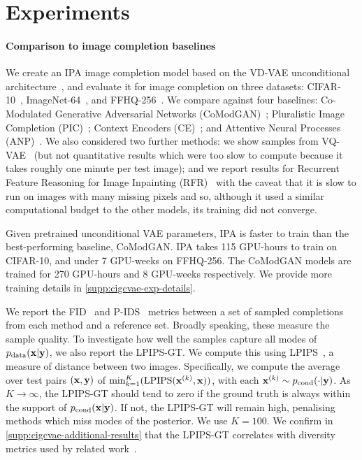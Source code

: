 \section{Experiments} \label{sec:cigcvae-experiments}

\paragraph{Comparison to image completion baselines}

We create an IPA image completion model based on the VD-VAE unconditional
architecture~\citep{child2020very}, and evaluate it for image completion on
three datasets: CIFAR-10~\citep{krizhevsky2009learning},
ImageNet-64~\citep{deng2009imagenet}, and FFHQ-256~\citep{karras2019style}. We
compare against four baselines: Co-Modulated Generative Adversarial Networks
(CoModGAN)~\citep{zhao2021large}; Pluralistic Image Completion
(PIC)~\citep{zheng2019pluralistic}; Context Encoders
(CE)~\citep{pathak2016context}; and Attentive Neural Processes
(ANP)~\citep{kim2019attentive}. We also considered two further methods: we show
samples from VQ-VAE~\citep{peng2021generating} (but not quantitative results
which were too slow to compute because it takes roughly one minute per test
image); and we report results for Recurrent Feature Reasoning for Image
Inpainting (RFR)~\citep{li2020recurrent} with the caveat that it is slow to run
on images with many missing pixels and so, although it used a similar
computational budget to the other models, its training did not converge.

Given pretrained unconditional VAE parameters, IPA is faster to train than the
best-performing baseline, CoModGAN. IPA takes 115 GPU-hours to train on
CIFAR-10, and under 7 GPU-weeks on FFHQ-256. The CoModGAN models are trained for
270 GPU-hours and 8 GPU-weeks respectively. We provide more training details in
\cref{supp:cigcvae-exp-details}.

We report the FID~\citep{heusel2017gans} and P-IDS~\citep{zhao2021large} metrics
between a set of sampled completions from each method and a reference set.
Broadly speaking, these measure the sample quality.
%
To investigate how well the samples capture all modes of
$p_{\rm{data}}{}(\mathbf{x}{}|\mathbf{y}{})$, we also report the LPIPS-GT. We compute this using
LPIPS~\citep{zhang2018unreasonable}, a measure of distance between two images.
Specifically, we compute the average over test pairs $(\mathbf{x}{}, \mathbf{y}{})$ of
$\min_{k=1}^K(\text{LPIPS}(\mathbf{x}{}^{(k)} , \mathbf{x}))$, with each $\mathbf{x}{}^{(k)} \sim
p_{\text{cond}}{}(\cdot | \mathbf{y})$. As $K \rightarrow \infty$, the LPIPS-GT should tend
to zero if the ground truth is always within the support of
$p_{\text{cond}}(\mathbf{x}{}|\mathbf{y}{})$. If not, the LPIPS-GT will remain high, penalising
methods which miss modes of the posterior. We use $K=100$. We confirm in
\cref{supp:cigcvae-additional-results} that the LPIPS-GT correlates with diversity
metrics used by related work~\citep{zhu2017toward,li2020multimodal}.


